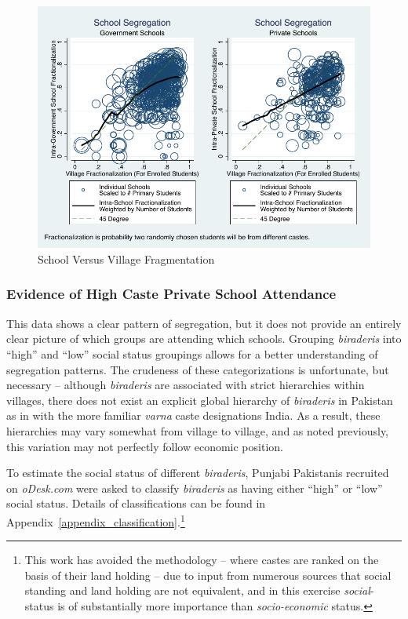 \documentclass[Eubank_pk_ethnic_sorting.tex]{subfiles}
\begin{document}
\begin{figure}[H]
	\begin{center}
	\caption{School Versus Village Fragmentation}\label{schoolvvillageherf}
	\includegraphics[scale=1.0]{../results/intra_versus_intervillage_frac_combined.pdf}
	\end{center}
\end{figure}



\subsubsection{Evidence of High Caste Private School Attendance}

This data shows a clear pattern of segregation, but it does not provide an entirely clear picture of which groups are attending which schools.  Grouping \emph{biraderis} into ``high'' and ``low'' social status groupings allows for a better understanding of segregation patterns. The crudeness of these categorizations is unfortunate, but necessary -- although \emph{biraderis} are associated with strict hierarchies within villages, there does not exist an explicit global hierarchy of \emph{biraderis} in Pakistan as in with the more familiar \emph{varna} caste designations India. As a result, these hierarchies may vary somewhat from village to village, and as noted previously, this variation may not perfectly follow economic position. 

To estimate the social status of different \emph{biraderis}, Punjabi Pakistanis recruited on \emph{oDesk.com} were asked to classify \emph{biraderis} as having either ``high'' or ``low'' social status. Details of classifications can be found in Appendix~\ref{appendix_classification}.\footnote{This work has avoided the \cite{Jacoby:2011tc} methodology -- where castes are ranked on the basis of their land holding -- due to input from numerous sources that social standing and land holding are not equivalent, and in this exercise \emph{social}-status is of substantially more importance than \emph{socio-economic} status.}
\end{document}
